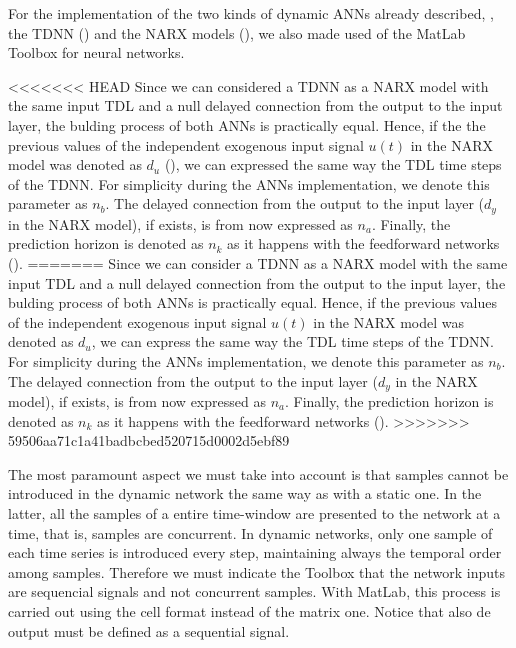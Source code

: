
\label{sec:application:tdnn}

For the implementation of the two kinds of dynamic ANNs already
described,
\ie, the TDNN () and the NARX models (), 
we also made used of the MatLab Toolbox for neural networks. 

<<<<<<< HEAD
Since we can considered a TDNN as a NARX model with the same input TDL 
and a null delayed connection from the output to the input layer, 
the bulding process of both ANNs is practically equal. Hence, if the the previous values of the independent exogenous input signal $u(t)$ in the NARX model was denoted as $d_{u}$ (), we can expressed the same way the TDL time steps of the TDNN. For simplicity during the ANNs implementation, we denote this parameter as $n_{b}$. The delayed connection from the output to the input layer ($d_{y}$ in the NARX model), if exists, is from now expressed as $n_{a}$. 
Finally, the prediction horizon is denoted as $n_{k}$ as it happens with the feedforward networks ().
=======
Since we can consider a TDNN as a NARX model with the same input TDL
and a null delayed connection from the output to the input layer, the
bulding process of both ANNs is practically equal. Hence, if the
previous values of the independent exogenous input signal $u(t)$ in
the NARX model was denoted as $d_{u}$, we can express the same way the
TDL time steps of the TDNN. For simplicity during the ANNs
implementation, we denote this parameter as $n_{b}$. The delayed
connection from the output to the input layer ($d_{y}$ in the NARX
model), if exists, is from now expressed as $n_{a}$.  Finally, the
prediction horizon is denoted as $n_{k}$ as it happens with the
feedforward networks ().
>>>>>>> 59506aa71c1a41badbcbed520715d0002d5ebf89

The most paramount aspect we must take into account is that samples
cannot be introduced in the dynamic network the same way as with a
static one.  In the latter, all the samples of a entire time-window
are presented to the network at a time, that is, samples are
concurrent.  In dynamic networks, only one sample of each time series
is introduced every step, maintaining always the temporal order among
samples. Therefore we must indicate the Toolbox that the network
inputs are sequencial signals and not concurrent samples. With MatLab,
this process is carried out using the cell format instead of the
matrix one. Notice that also de output must be defined as a sequential
signal.

